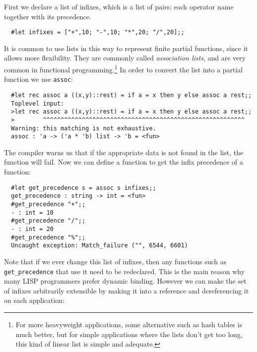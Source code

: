 First we declare a list of infixes, which is a list of pairs: each operator
name together with its precedence.

\begin{boxed}\begin{verbatim}
  #let infixes = ["+",10; "-",10; "*",20; "/",20];;
\end{verbatim}\end{boxed}

It is common to use lists in this way to represent finite partial functions,
since it allows more flexibility. They are commonly called {\em association
lists}, and are very common in functional programming.\footnote{For more
heavyweight applications, some alternative such as hash tables is much better,
but for simple applications where the lists don't get too long, this kind of
linear list is simple and adequate.} In order to convert the list into a
partial function we use {\tt assoc}:

\begin{boxed}\begin{verbatim}
  #let rec assoc a ((x,y)::rest) = if a = x then y else assoc a rest;;
  Toplevel input:
  >let rec assoc a ((x,y)::rest) = if a = x then y else assoc a rest;;
  >        ^^^^^^^^^^^^^^^^^^^^^^^^^^^^^^^^^^^^^^^^^^^^^^^^^^^^^^^^^
  Warning: this matching is not exhaustive.
  assoc : 'a -> ('a * 'b) list -> 'b = <fun>
\end{verbatim}\end{boxed}

The compiler warns us that if the appropriate data is not found in the list,
the function will fail. Now we can define a function to get the infix
precedence of a function:

\begin{boxed}\begin{verbatim}
  #let get_precedence s = assoc s infixes;;
  get_precedence : string -> int = <fun>
  #get_precedence "+";;
  - : int = 10
  #get_precedence "/";;
  - : int = 20
  #get_precedence "%";;
  Uncaught exception: Match_failure ("", 6544, 6601)
\end{verbatim}\end{boxed}

Note that if we ever change this list of infixes, then any functions such as
{\tt get\_precedence} that use it need to be redeclared. This is the main
reason why many LISP programmers prefer dynamic binding. However we can make
the set of infixes arbitrarily extensible by making it into a reference and
dereferencing it on each application:


